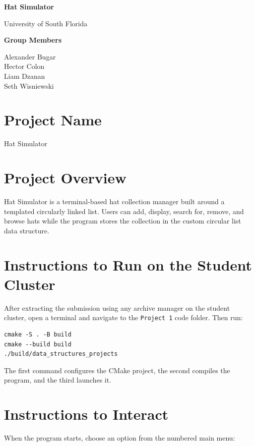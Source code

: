 \documentclass[11pt,letterpaper]{article}
\begin{document}
\begin{center}
    {\LARGE\bfseries Hat Simulator\par}
    \vspace{5pt}
    {\large University of South Florida\par}
    \vspace{10pt}
    {\bfseries Group Members\par}
    Alexander Bugar\\
    Hector Colon\\
    Liam Dzanan\\
    Seth Wisniewski
\end{center}

\section*{Project Name}
Hat Simulator

\section*{Project Overview}
Hat Simulator is a terminal-based hat collection manager built around a templated circularly linked list. Users can add, display, search for, remove, and browse hats while the program stores the collection in the custom circular list data structure.

\section*{Instructions to Run on the Student Cluster}
After extracting the submission using any archive manager on the student cluster, open a terminal and navigate to the \texttt{Project 1} code folder. Then run:

\begin{verbatim}
cmake -S . -B build
cmake --build build
./build/data_structures_projects
\end{verbatim}

The first command configures the CMake project, the second compiles the program, and the third launches it.

\section*{Instructions to Interact}
When the program starts, choose an option from the numbered main menu:
\end{document}
